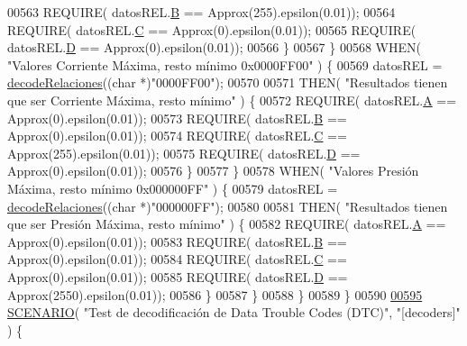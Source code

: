 \begin{DoxyCode}
{{{00563                 REQUIRE( datosREL.\hyperlink{structRelacionesResponse_a1216f6019af393dd85853f352533ed9d}{B} == Approx(255).epsilon(0.01));
00564                 REQUIRE( datosREL.\hyperlink{structRelacionesResponse_a37feda02f128b77f4f2d61cabcddc9e7}{C} == Approx(0).epsilon(0.01));
00565                 REQUIRE( datosREL.\hyperlink{structRelacionesResponse_ab76f55b12df3754a9bb5b102a1c06cbc}{D} == Approx(0).epsilon(0.01));
00566             \}
00567         \}
00568         WHEN( \textcolor{stringliteral}{"Valores Corriente Máxima, resto mínimo 0x0000FF00"} ) \{
00569             datosREL = \hyperlink{decoders_8cpp_a88d7079325bf81705583d9f2101cfa15}{decodeRelaciones}((\textcolor{keywordtype}{char} *)\textcolor{stringliteral}{"0000FF00"});
00570 
00571             THEN( \textcolor{stringliteral}{"Resultados tienen que ser Corriente Máxima, resto mínimo"} ) \{
00572                 REQUIRE( datosREL.\hyperlink{structRelacionesResponse_a560d1e6af01b999625b467ef3f858181}{A} == Approx(0).epsilon(0.01));
00573                 REQUIRE( datosREL.\hyperlink{structRelacionesResponse_a1216f6019af393dd85853f352533ed9d}{B} == Approx(0).epsilon(0.01));
00574                 REQUIRE( datosREL.\hyperlink{structRelacionesResponse_a37feda02f128b77f4f2d61cabcddc9e7}{C} == Approx(255).epsilon(0.01));
00575                 REQUIRE( datosREL.\hyperlink{structRelacionesResponse_ab76f55b12df3754a9bb5b102a1c06cbc}{D} == Approx(0).epsilon(0.01));
00576             \}
00577         \}
00578         WHEN( \textcolor{stringliteral}{"Valores Presión Máxima, resto mínimo 0x000000FF"} ) \{
00579             datosREL = \hyperlink{decoders_8cpp_a88d7079325bf81705583d9f2101cfa15}{decodeRelaciones}((\textcolor{keywordtype}{char} *)\textcolor{stringliteral}{"000000FF"});
00580 
00581             THEN( \textcolor{stringliteral}{"Resultados tienen que ser Presión Máxima, resto mínimo"} ) \{
00582                 REQUIRE( datosREL.\hyperlink{structRelacionesResponse_a560d1e6af01b999625b467ef3f858181}{A} == Approx(0).epsilon(0.01));
00583                 REQUIRE( datosREL.\hyperlink{structRelacionesResponse_a1216f6019af393dd85853f352533ed9d}{B} == Approx(0).epsilon(0.01));
00584                 REQUIRE( datosREL.\hyperlink{structRelacionesResponse_a37feda02f128b77f4f2d61cabcddc9e7}{C} == Approx(0).epsilon(0.01));
00585                 REQUIRE( datosREL.\hyperlink{structRelacionesResponse_ab76f55b12df3754a9bb5b102a1c06cbc}{D} == Approx(2550).epsilon(0.01));
00586             \}
00587         \}
00588     \}
00589 \}
00590 
\hyperlink{UnitTestCase_8cpp_a32f4d6ded472fa78eead34a000bb2bbd}{00595} \hyperlink{UnitTestCase_8cpp_aa6afb62ebdd4c3e07996c995f623eb6b}{SCENARIO}( \textcolor{stringliteral}{"Test de decodificación de Data Trouble Codes (DTC)"}, \textcolor{stringliteral}{"[decoders]"} ) \{
}}}
\end{DoxyCode}
